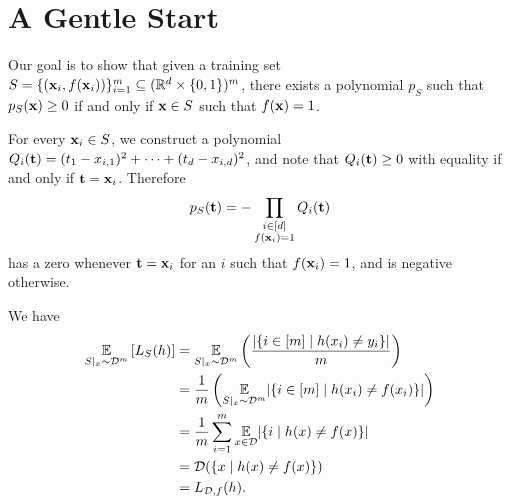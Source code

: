 \chapter{A Gentle Start}

\begin{ex}
  Our goal is to show that given a training set
  $S=\{(\mathbf{x}_i, f(\mathbf{x}_i))\}_{i=1}^m\subseteq (\mathbb{R}^d\times \{0, 1\})^m$,
  there exists a polynomial $p_S$ such that $p_S(\mathbf{x})\geq 0$ if and only if
  $\mathbf{x}\in S$ such that $f(\mathbf{x})=1$.

  For every $\mathbf{x}_i\in S$, we construct a polynomial
  $Q_i(\mathbf{t})=(t_1-x_{i,1})^2+\cdots+(t_d-x_{i,d})^2$,
  and note that $Q_i(\mathbf{t})\geq 0$ with equality if and only if
  $\mathbf{t}=\mathbf{x}_i$. Therefore
  \begin{align*}
    p_S(\mathbf{t})=-\prod_{\substack{i \in [d] \\ f(\mathbf{x}_i) = 1}}Q_i(\mathbf{t})
  \end{align*}
  has a zero whenever $\mathbf{t}=\mathbf{x}_i$ for an $i$ such that $f(\mathbf{x}_i)=1$, and is
  negative otherwise.
\end{ex}

\begin{ex}
  We have
  \begin{align*}
    \underset{S|_x \sim \mathcal{D}^m}{\mathbb{E}}\left[L_S(h)\right]
     & = \underset{S|_x \sim \mathcal{D}^m}{\mathbb{E}}\left(\frac{|\{i\in[m] \mid h(x_i)\neq y_i\}|}{m}\right)     \\
     & = \frac{1}{m}\left(\underset{S|_x \sim \mathcal{D}^m}{\mathbb{E}}|\{i\in[m] \mid h(x_i)\neq f(x_i)\}|\right) \\
     & = \frac{1}{m}\sum_{i=1}^m\underset{x\in \mathcal{D}}{\mathbb{E}}|\{i \mid h(x)\neq f(x)\}|                   \\
     & = \mathcal{D}(\{x \mid h(x)\neq f(x) \})                                                             \\
     & = L_{\mathcal{D}, f}(h).
  \end{align*}
\end{ex}

\begin{ex}
\end{ex}
